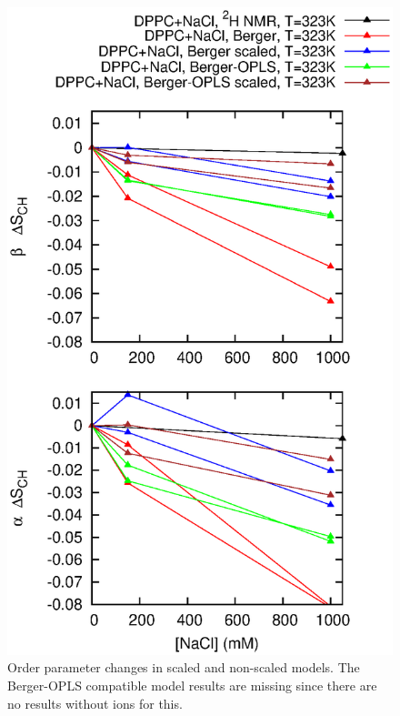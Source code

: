 \documentclass[pre,aps,floatfix,authordate1-4,twocolumn]{revtex4-1}
\begin{document}
\begin{figure}[]
  \centering
  \includegraphics[width=\textwidth]{../Fig/OrderParameterIONSchangesSCALED.eps} %
  \caption{\label{OPchangesSCALED}
    Order parameter changes in scaled and non-scaled models. The Berger-OPLS compatible model results are missing since there are
    no results without ions for this.
}
\end{figure}
\end{document}
